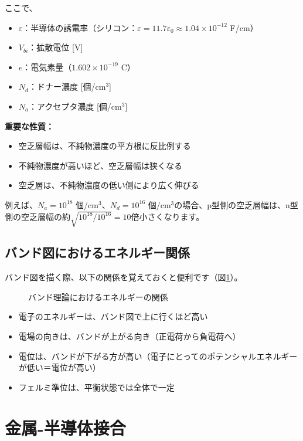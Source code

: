 ここで、
\begin{itemize}
\item $\varepsilon$：半導体の誘電率（シリコン：$\varepsilon = 11.7 \varepsilon_0 \approx 1.04 \times 10^{-12}$ F/cm）
\item $V_{bi}$：拡散電位 [V]
\item $e$：電気素量（$1.602 \times 10^{-19}$ C）
\item $N_d$：ドナー濃度 [個/cm$^3$]
\item $N_a$：アクセプタ濃度 [個/cm$^3$]
\end{itemize}

\textbf{重要な性質：}
\begin{itemize}
\item 空乏層幅は、不純物濃度の平方根に反比例する
\item 不純物濃度が高いほど、空乏層幅は狭くなる
\item 空乏層は、不純物濃度の低い側により広く伸びる
\end{itemize}

例えば、$N_a = 10^{18}$ 個/cm$^3$、$N_d = 10^{16}$ 個/cm$^3$の場合、p型側の空乏層幅は、n型側の空乏層幅の約$\sqrt{10^{18}/10^{16}} = 10$倍小さくなります。

\subsection{バンド図におけるエネルギー関係}

バンド図を描く際、以下の関係を覚えておくと便利です（図\ref{fig:band_energy}）。

\begin{figure}[H]
\centering
{}
\caption{バンド理論におけるエネルギーの関係}
\label{fig:band_energy}
\end{figure}

\begin{itemize}
\item 電子のエネルギーは、バンド図で上に行くほど高い
\item 電場の向きは、バンドが上がる向き（正電荷から負電荷へ）
\item 電位は、バンドが下がる方が高い（電子にとってのポテンシャルエネルギーが低い＝電位が高い）
\item フェルミ準位は、平衡状態では全体で一定
\end{itemize}


\section{金属-半導体接合}

